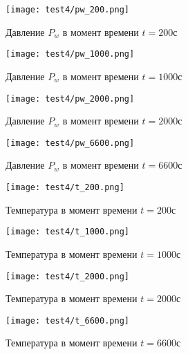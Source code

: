 \begin{figure}
  \begin{center}
    \begin{minipage}[h]{0.49\textwidth}
       \texttt{[image: test4/pw\_200.png]} 
       \caption{Давление $P_w$ в момент времени $t=200$с}
    \end{minipage}
    \hfill
    \begin{minipage}[h]{0.49\textwidth}
       \texttt{[image: test4/pw\_1000.png]} 
       \caption{Давление $P_w$ в момент времени $t=1000$с}
    \end{minipage}
    \vfill
    \begin{minipage}[h]{0.49\textwidth}
       \texttt{[image: test4/pw\_2000.png]} 
       \caption{Давление $P_w$ в момент времени $t=2000$с}
    \end{minipage}
    \hfill
    \begin{minipage}[h]{0.49\textwidth}
       \texttt{[image: test4/pw\_6600.png]} 
       \caption{Давление $P_w$ в момент времени $t=6600$с}
    \end{minipage}
    \hfill  
  \end{center}
\end{figure}

\begin{figure}
  \begin{center}
    \begin{minipage}[h]{0.49\textwidth}
       \texttt{[image: test4/t\_200.png]} 
       \caption{Температура в момент времени $t=200$с}
    \end{minipage}
    \hfill
    \begin{minipage}[h]{0.49\textwidth}
       \texttt{[image: test4/t\_1000.png]} 
       \caption{Температура в момент времени $t=1000$с}
    \end{minipage}
    \vfill
    \begin{minipage}[h]{0.49\textwidth}
       \texttt{[image: test4/t\_2000.png]} 
       \caption{Температура в момент времени $t=2000$с}
    \end{minipage}
    \hfill
    \begin{minipage}[h]{0.49\textwidth}
       \texttt{[image: test4/t\_6600.png]} 
       \caption{Температура в момент времени $t=6600$с}
    \end{minipage}
    \hfill  
  \end{center}
\end{figure}

